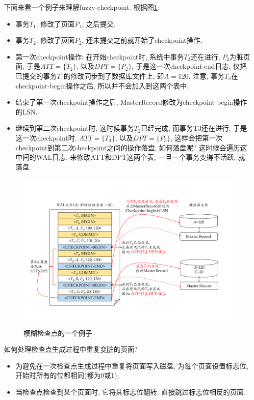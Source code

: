 下面来看一个例子来理解fuzzy-checkpoint. 根据图\ref{fig:fuzzy}:
\begin{itemize}
    \item 事务$T_1$: 修改了页面$P_1$, 之后提交.
    \item 事务$T_2$: 修改了页面$P_2$, 还未提交之前就开始了checkpoint操作.
    \item 第一次checkpoint操作: 在开始checkpoint时, 系统中事务$T_2$还在进行, $P_2$为脏页面, 于是$ATT=\{T_2\}$, 以及$DPT=\{P_2\}$, 于是这一次checkpoint-end日志, 仅把已提交的事务$T_1$的修改同步到了数据库文件上, 即$A=120$. 注意, 事务$T_3$在checkpoint-begin操作之后, 所以并不会加入到这两个表中.
    \item 结束了第一次checkpoint操作之后, MasterRecord修改为checkpoint-begin操作的LSN.
    \item 继续到第二次checkpoint时, 这时候事务$T_2$已经完成, 而事务T3还在进行, 于是这一次checkpoint时, $ATT=\{T_3\}$, 以及$DPT=\{P_3\}$, 这样会把第一次checkpoint到第二次checkpoint之间的操作落盘, 如何落盘呢? 这时候会遍历这中间的WAL日志, 来修改ATT和DPT这两个表, 一旦一个事务变得不活跃, 就落盘.
\end{itemize}

\begin{figure}[H]
    \centering
    \includegraphics[width=.9\textwidth]{figure/FUZZY.pdf}
    \caption{模糊检查点的一个例子}
    \label{fig:fuzzy}
\end{figure}

如何处理检查点生成过程中重复变脏的页面?
\begin{itemize}
    \item 为避免在一次检查点生成过程中重复将页面写入磁盘, 为每个页面设置标志位, 开始时所有的位都相同(都为0或1);
    \item 当检查点检查到某个页面时, 它将其标志位翻转, 直接跳过标志位相反的页面.
\end{itemize}

